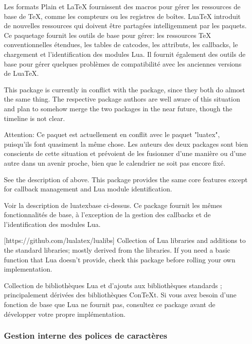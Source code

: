 \documentclass{lltxdoc}
\begin{document}
Les formats Plain et LaTeX fournissent des macros pour gérer les ressources de base de TeX, comme les compteurs ou les registres de boîtes. LuaTeX introduit de nouvelles ressources qui doivent être partagées intelligemment par les paquets. Ce paquetage fournit les outils de base pour gérer: les ressources TeX conventionnelles étendues, les tables de catcodes, les attributs, les callbacks, le chargement et l'identification des modules Lua. Il fournit également des outils de base pour gérer quelques problèmes de compatibilité avec les anciennes versions de LuaTeX.

 This package is currently in conflict with the 
package, since they both do almost the same thing. The respective package
authors are well aware of this situation and plan to somehow merge the two
packages in the near future, though the timeline is not clear.

Attention: Ce paquet est actuellement en conflit avec le paquet "luatex", puisqu'ils font quasiment la même chose. Les auteurs des deux packages sont bien conscients de cette situation et prévoient de les fusionner d'une manière ou d'une autre dans un avenir proche, bien que le calendrier ne soit pas encore fixé.

See the description of  above. This package provides the same
core features except for callback management and Lua module identification.

Voir la description de luatexbase ci-dessus. Ce package fournit les mêmes fonctionnalités de base, à l'exception de la gestion des callbacks et de l'identification des modules Lua.

[https://github.com/lualatex/lualibs]
Collection of Lua libraries and additions to the standard libraries; mostly
derived from the \context libraries. If you need a basic function that Lua
doesn't provide, check this package before rolling your own implementation.

Collection de bibliothèques Lua et d'ajouts aux bibliothèques standards ; principalement dérivées des bibliothèques ConTeXt. Si vous avez besoin d'une fonction de base que Lua ne fournit pas, consultez ce package avant de développer votre propre implémentation.

\subsubsection{Gestion interne des polices de caractères}\label{fontint}
\end{document}
